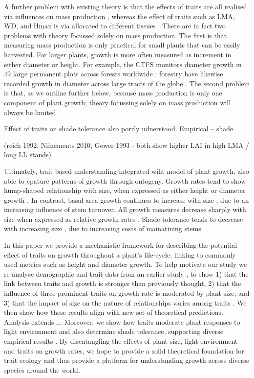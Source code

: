 \documentclass[a4paper,11pt]{article}
\begin{document}
A further problem with existing theory is that the effects of traits are all
realised via influences on mass production \citep{Enquist-2007},
whereas the effect of traits such as LMA, WD, and Hmax is via allocated
to different tissues \citep{Falster-2011}. There are in fact two problems with theory
focussed solely on mass production. The first is that measuring mass
production is only practical for small plants that can be easily harvested.
For larger plants, growth is more often measured as increment in either diameter
or height. For example, the CTFS monitors diameter growth in 49 large permanent
plots across forests worldwide \citep{Anderson-2015};
 forestry have likewise recorded growth in diameter across
large tracts of the globe \citep{Purves-2008}. The second problem is
that, as we outline further below, because mass production is only one
component of plant growth; theory focussing solely on mass production will
 always be limited.

Effect of traits on shade tolerance also porrly udnerstood. Empirical -- shade

(reich 1992, Niinements 2010, Gower-1993 - both show higher LAI in high LMA / long LL stands)

Ultimately, trait based understanding integrated wiht model of plant growth, also able to cpature patterns of growth through ontogeny. Growth rates tend to show hump-shaped relationship with size, when expressed as either height \citep{Sillett-2010, King-2011} or diameter growth \citep{Herault-2011}.  In contrast, basal-area growth continues to increase with size \citep{Sillett-2010, Stephenson-2014}, due to an increasing influence of stem turnover. All growth measures decrease sharply with size when expressed as relative growth rates \citep{Rees-2010, Iida-2014}. Shade tolerance tends to decrease with increasing size \citep{Lusk-2006}, due to increasing costs of mainatining stems \citep{Givnish-1988}

In this paper we provide a mechanistic framework for describing the potential
effect of traits on growth throughout a plant's life-cycle, linking to
commonly used metrics such as height and diameter growth. To help motivate our
study we re-analyse demographic and trait data from an earlier study
 \citep{Wright-2010}, to show 1) that the link between traits and
growth is stronger than previously thought, 2) that the influence of three
prominent traits on growth rate is moderated by plant size, and 3) that the
impact of size on the nature of relationships varies among traits
 \citep[see also]{Ruger-2012}. We then show how these results align with new
set of theoretical predictions. Analysis extends ...
Moreover, we show how traits moderate plant
responses to light environment and also determine shade tolerance, supporting
diverse empirical results \citep{Ruger-2012, Poorter-2006}. By
disentangling the effects of plant size, light environment and traits on
growth rates, we hope to provide a solid theoretical foundation for trait
ecology and thus provide a platform for understanding growth across diverse
species around the world.
\end{document}

